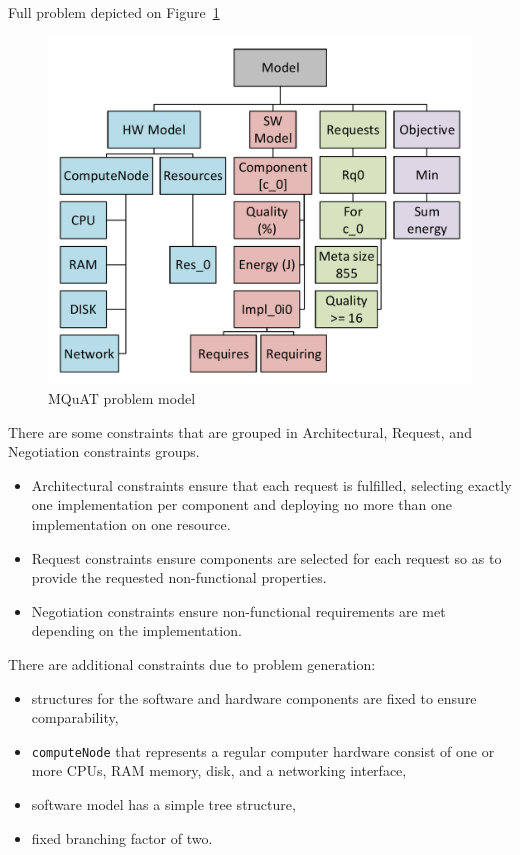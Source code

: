 Full problem depicted on Figure~\ref{fig:mquatmodel}

\begin{figure}
	\centering
	\includegraphics[width=\textwidth]{images/MQuATModel}
	\caption[MQuAT problem model]{MQuAT problem model}
	\label{fig:mquatmodel}
\end{figure}

There are some constraints that are grouped in Architectural, Request, and Negotiation constraints groups.

\begin{itemize}
	\item Architectural constraints ensure that each request is fulfilled, selecting exactly one implementation per component and deploying no more than one implementation on one resource.
	\item Request constraints ensure components are selected for each request so as to provide the requested non-functional properties.
	\item Negotiation constraints ensure non-functional requirements are met depending on the implementation.
\end{itemize}

There are additional constraints due to problem generation:

\begin{itemize}
	\item structures for the software and hardware components are fixed to ensure comparability,
	\item \texttt{computeNode} that represents a regular computer hardware consist of one or more CPUs, RAM memory, disk, and a networking interface,
	\item software model has a simple tree structure,
	\item fixed branching factor of two.
\end{itemize}


